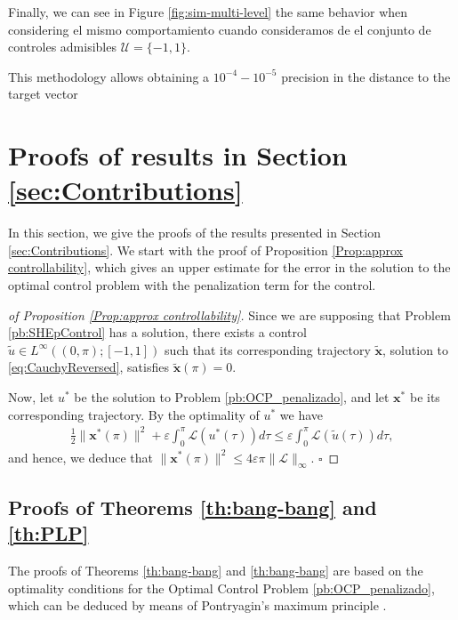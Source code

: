 \documentclass[twocolumn]{autart}    %
\begin{document}
\begin{remark}
Finally, we can see in Figure \ref{fig:sim-multi-level} the same behavior when considering el mismo comportamiento cuando consideramos de el conjunto de controles admisibles $\mathcal{U} = \{-1,1\}$.
 
This methodology allows obtaining a $10^{-4}-10^{-5}$ precision in the distance to the target vector

\section{Proofs of results in Section \ref{sec:Contributions}}\label{sec:Proof}

In this section, we give the proofs of the results presented in Section \ref{sec:Contributions}. We start with the proof of Proposition \ref{Prop:approx controllability}, which gives an upper estimate for the error in the solution to the optimal control problem with the penalization term for the control. 

\bigskip

\begin{proof}[of Proposition \ref{Prop:approx controllability}]
Since we are supposing that Problem \ref{pb:SHEpControl} has a solution, there exists a control $\tilde{u}\in L^\infty((0,\pi); [-1,1])$ such that its corresponding trajectory $\tilde{\bm{x}}$, solution to \eqref{eq:CauchyReversed}, satisfies $\tilde{\bm{x}}(\pi) = 0$. 

Now, let $u^\ast$ be the solution to Problem \ref{pb:OCP_penalizado}, and let $\bm{x}^\ast$ be its corresponding trajectory. By the optimality of $u^\ast$ we have
\begin{align*}
	\frac{1}{2} \| \bm{x}^\ast(\pi)\|^2 +\varepsilon \int_0^\pi \mathcal{L}(u^\ast(\tau))d\tau \leq \varepsilon \int_0^\pi \mathcal{L}(\tilde{u}(\tau))d\tau,
\end{align*}
and hence, we deduce that $\| \bm{x}^\ast (\pi)\|^2 \leq 4 \varepsilon \pi \| \mathcal{L}\|_\infty.$ \hfill $\square$
\end{proof}

\subsection{Proofs of Theorems \ref{th:bang-bang} and \ref{th:PLP}}

The proofs of Theorems \ref{th:bang-bang} and \ref{th:bang-bang} are based on the optimality conditions for the Optimal Control Problem \ref{pb:OCP_penalizado}, which can be deduced by means of Pontryagin's maximum principle \cite[Chapter~2.7]{bryson1975applied}.


\end{remark}
\end{document}
